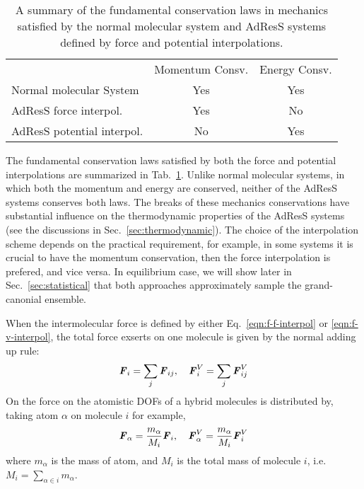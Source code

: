 \documentclass[epjST]{svjour}
\newcommand{\vect}[1]{\textbf{\textit{#1}}}
\newcommand{\moleidxone}[0]{i}
\newcommand{\moleidxtwo}[0]{j}
\newcommand{\atomidxone}[0]{\alpha}
\begin{document}
\begin{table}
  \centering
  \caption{A summary of the fundamental conservation laws in mechanics 
    satisfied by the normal molecular system and AdResS systems defined by force and potential interpolations.}
  \label{tab:conv-laws}
  \begin{tabular*}{0.8\textwidth}{@{\extracolsep{\fill}}lcc}\hline\hline
    &         Momentum Consv.     &       Energy Consv. \\
    Normal molecular System     &       {Yes}        &       {Yes}\\      
    AdResS force interpol.   &       {Yes}        &       {No}\\      
    AdResS potential interpol.  &     {No}  &       {Yes}\\\hline\hline
  \end{tabular*}
\end{table}
The fundamental conservation laws satisfied by both the force and potential interpolations
are summarized in Tab.~\ref{tab:conv-laws}. Unlike normal molecular systems, in which both
the momentum and energy are conserved, neither of the AdResS systems conserves
both laws. The breaks of these mechanics conservations have substantial influence on the thermodynamic
properties of the AdResS systems (see the discussions in Sec.~\ref{sec:thermodynamic}). The choice of the interpolation scheme depends on
the practical requirement, for example, in some systems it is crucial to have the momentum
conservation, then the force interpolation is prefered, and vice versa.
In equilibrium case, we will show later in Sec.~\ref{sec:statistical}
that both approaches approximately sample the grand-canonial ensemble.

When the intermolecular force is defined by either
Eq.~\eqref{eqn:f-f-interpol} or \eqref{eqn:f-v-interpol}, the total
force exserts on one molecule is given by the normal adding up rule:
\begin{align}
  \vect F_\moleidxone = \sum_\moleidxtwo \vect F_{\moleidxone\moleidxtwo}, \quad \vect F^V_\moleidxone = \sum_\moleidxtwo \vect F^V_{\moleidxone\moleidxtwo}
\end{align}
On the force on the atomistic DOFs of a hybrid molecules is distributed 
by, taking atom $\atomidxone$ on molecule $\moleidxone$ for example,
\begin{align}
  \vect F_\atomidxone = \frac{m_\atomidxone}{M_\moleidxone}\vect F_\moleidxone, \quad   \vect F^V_\atomidxone = \frac{m_\atomidxone}{M_\moleidxone}\vect F^V_\moleidxone 
\end{align}
where $m_\atomidxone$ is the mass of atom, and $M_\moleidxone$ is the total mass of molecule $\moleidxone$, i.e.~$M_\moleidxone = \sum_{\atomidxone\in\moleidxone}m_\atomidxone$.
\end{document}

